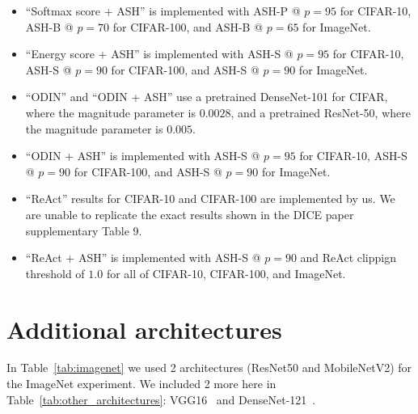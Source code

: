 \documentclass{article}
\newcommand{\tabref}[1]{Table~\ref{tab:#1}}
\begin{document}
\begin{itemize}
    \item ``Softmax score + ASH'' is implemented with ASH-P @ $p=95$ for CIFAR-10, ASH-B @ $p=70$ for CIFAR-100, and ASH-B @ $p=65$ for ImageNet.
    \item ``Energy score + ASH'' is implemented with ASH-S @ $p=95$ for CIFAR-10, ASH-S @ $p=90$ for CIFAR-100, and ASH-S @ $p=90$ for ImageNet.
    \item ``ODIN'' and ``ODIN + ASH'' use a pretrained DenseNet-101 for CIFAR, where the magnitude parameter is $0.0028$, and a pretrained ResNet-50, where the magnitude parameter is $0.005$.
    \item ``ODIN + ASH'' is implemented with ASH-S @ $p=95$ for CIFAR-10, ASH-S @ $p=90$ for CIFAR-100, and ASH-S @ $p=90$ for ImageNet.
    \item ``ReAct'' results for CIFAR-10 and CIFAR-100 are implemented by us. We are unable to replicate the exact results shown in the DICE paper supplementary Table 9.
    \item ``ReAct + ASH'' is implemented with ASH-S @ $p=90$ and ReAct clippign threshold of $1.0$ for all of CIFAR-10, CIFAR-100, and ImageNet.
\end{itemize}

\section{Additional architectures}
In \tabref{imagenet} we used 2 architectures (ResNet50 and MobileNetV2) for the ImageNet experiment. We included 2 more here in \tabref{other_architectures}: VGG16~\citep{simonyan2014very} and DenseNet-121~\citep{huang2017densely}.
\end{document}
